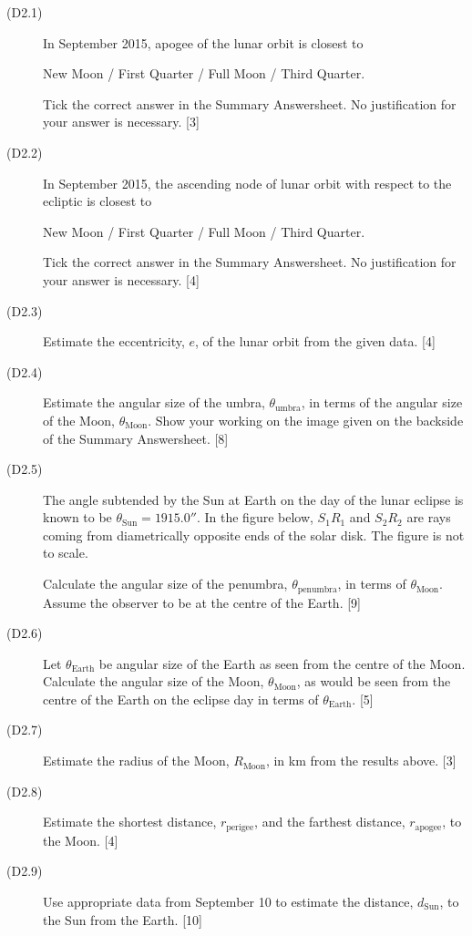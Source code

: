 \begin{description}
\item[(D2.1)] In September 2015, apogee of the lunar orbit is closest to

  New Moon / First Quarter / Full Moon / Third Quarter.

  Tick the correct answer in the Summary Answersheet. No justification for
  your answer is necessary. \hfill[3]
\item[(D2.2)] In September 2015, the ascending node of lunar orbit with
  respect to the ecliptic is closest to

  New Moon / First Quarter / Full Moon / Third Quarter.

  Tick the correct answer in the Summary Answersheet. No justification for
  your answer is necessary. \hfill[4]
\item[(D2.3)] Estimate the eccentricity, $e$, of the lunar orbit from the
  given data. \hfill[4]
\item[(D2.4)] Estimate the angular size of the umbra,
  $\theta_{\mathrm{umbra}}$, in terms of the angular size of the Moon,
  $\theta_{\mathrm{Moon}}$. Show your working on the image given on the
  backside of the Summary Answersheet. \hfill[8]
\item[(D2.5)] The angle subtended by the Sun at Earth on the day of the lunar
  eclipse is known to be $\theta_{\mathrm{Sun}} = 1915.0''$. In the figure
  below, $S_1 R_1$ and $S_2 R_2$ are rays coming from diametrically opposite
  ends of the solar disk. The figure is not to scale.


  Calculate the angular size of the penumbra, $\theta_{\mathrm{penumbra}}$,
  in terms of $\theta_{\mathrm{Moon}}$. Assume the observer to be at the
  centre of the Earth. \hfill[9]
\item[(D2.6)] Let $\theta_{\mathrm{Earth}}$ be angular size of the Earth as
  seen from the centre of the Moon. Calculate the angular size of the Moon,
  $\theta_{\mathrm{Moon}}$, as would be seen from the centre of the Earth on
  the eclipse day in terms of $\theta_{\mathrm{Earth}}$. \hfill[5]
\item[(D2.7)] Estimate the radius of the Moon, $R_{\mathrm{Moon}}$, in km
  from the results above. \hfill[3]
\item[(D2.8)] Estimate the shortest distance, $r_{\mathrm{perigee}}$, and the
  farthest distance, $r_{\mathrm{apogee}}$, to the Moon. \hfill[4]
\item[(D2.9)] Use appropriate data from September 10 to estimate the
  distance, $d_{\mathrm{Sun}}$, to the Sun from the Earth. \hfill[10]
\end{description}

